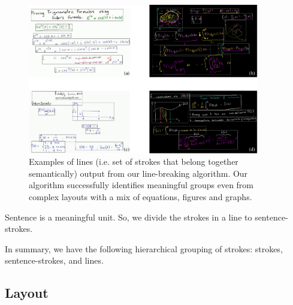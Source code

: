 \begin{figure}[h]
        \centering
        \includegraphics[width=0.9\textwidth]{images/example_lines}
        \caption{Examples of lines (i.e. set of strokes that belong together semantically) output from our line-breaking algorithm. Our algorithm successfully identifies meaningful groups even from complex layouts with a mix of equations, figures and graphs.}
        \label{Fig:line_examples}
\end{figure}

Sentence is a meaningful unit. So, we divide the strokes in a line to sentence-strokes.

In summary, we have the following hierarchical grouping of strokes: strokes, sentence-strokes, and lines.



\subsection{Layout}


